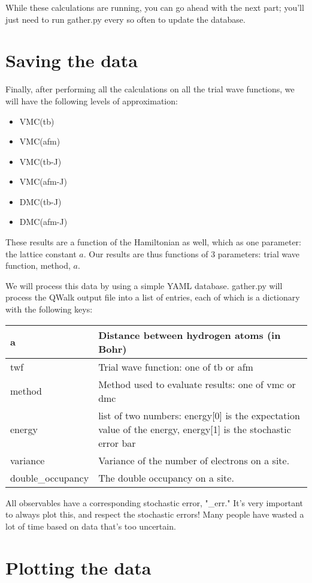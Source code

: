 \documentclass[12pt]{article}
\begin{document}
While these calculations are running, you can go ahead with the next part; you'll just need to run gather.py every so often to update the database.

\section*{Saving the data}

Finally, after performing all the calculations on all the trial wave functions, we will have the following levels of approximation:
\begin{itemize}
\item VMC(tb)
\item VMC(afm)
\item VMC(tb-J)
\item VMC(afm-J)
\item DMC(tb-J)
\item DMC(afm-J)	
\end{itemize}
These results are a function of the Hamiltonian as well, which as one parameter: the lattice constant $a$. 
Our results are thus functions of 3 parameters: trial wave function, method, $a$.

We will process this data by using a simple YAML database.
gather.py will process the QWalk output file into a list of entries, each of which is a dictionary with the following keys:

\begin{tabular}{l|p{}}
\hline
a & Distance between hydrogen atoms (in Bohr) \\
\hline
twf & Trial wave function: one of tb or afm \\
\hline
method & Method used to evaluate results: one of vmc or dmc \\
\hline
energy & list of two numbers: energy[0] is the expectation value of the energy, energy[1] is the stochastic error bar \\
\hline
variance & Variance of the number of electrons on a site.\\
\hline
double\_occupancy & The double occupancy on a site.\\
\hline
\end{tabular}

All observables have a corresponding stochastic error, "\_err."
It's very important to always plot this, and respect the stochastic errors! 
Many people have wasted a lot of time based on data that's too uncertain.

\section*{Plotting the data}
\end{document}
